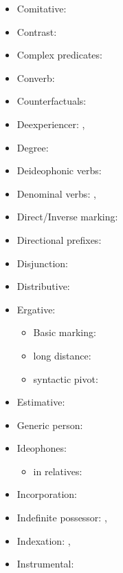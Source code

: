 \documentclass[oldfontcommands,oneside,a4paper,11pt]{article}
\begin{document}
\begin{itemize}
\item Comitative: \citet[272-4]{jacques14linking}
\item Contrast:  \citet[315-8]{jacques14linking}
\item Complex predicates: \citet{jacques12incorp}
\item Converb:  \citet[269-272;307-8;321-2]{jacques14linking}
\item Counterfactuals:  \citet[301-2]{jacques14linking}
\item Deexperiencer: \citet[216-7]{jacques12demotion}, \citet{jacques14antipassive}
\item Degree: \citet{jacques15comparative}
\item Deideophonic verbs: \citet[278-282]{japhug14ideophones}
\item Denominal verbs:  \citet{jacques12incorp}, \citet{jacques14antipassive}
\item Direct/Inverse marking: \citet{jacques10inverse}
\item Directional prefixes:  \citet[267-8]{jacques14linking}
\item Disjunction:  \citet[318-9]{jacques14linking}
\item Distributive: \citet{jacques15comparative}
\item Ergative:   \citet{jacques15comparative}
\begin{itemize}
\item Basic marking: \citet[131-2]{jacques10inverse}
\item long distance: \citet[278]{jacques14linking}
\item syntactic pivot:   \citet[208]{jacques12demotion}
\end{itemize}
\item Estimative: \citet{jacques13tropative}
\item Generic person:   \citet[204-8]{jacques12demotion}
\item Ideophones: \citet{japhug14ideophones}
\begin{itemize}
\item in relatives: \citet[275]{japhug14ideophones}
\end{itemize}
\item Incorporation: \citet{jacques12incorp}
\item Indefinite possessor: \citet[1212]{jacques12incorp}, \citet[4]{jacques14antipassive}
\item Indexation: \citet{jacques10inverse}, \citet[85]{jacques12agreement}
\item Instrumental: \citet{jacques15comparative}

\end{itemize}
\end{document}
